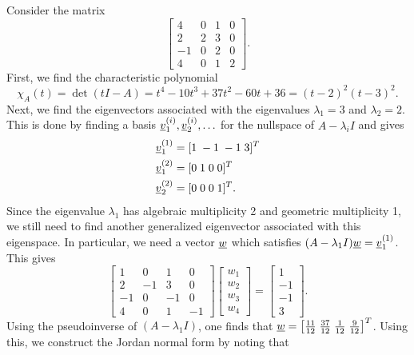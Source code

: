 \begin{example}
Consider the matrix
\begin{equation*}
\begin{bmatrix} 4 & 0 & 1 & 0 \\ 2 & 2 & 3 & 0 \\ -1 & 0 & 2 & 0 \\ 4 & 0 & 1 & 2 \end{bmatrix} .
\end{equation*}
First, we find the characteristic polynomial
\[ \chi_A (t) = \det (t I - A) = t^4 - 10 t^3 + 37 t^2 -60 t + 36 = (t-2)^2 (t-3)^2. \]
Next, we find the eigenvectors associated with the eigenvalues $\lambda_1 = 3$ and $\lambda_2 = 2$.
This is done by finding a basis $\underline{v}^{(i)}_1, \underline{v}^{(i)}_2, \ldots$ for the nullspace of $A - \lambda_i I$ and gives
\begin{align*}
\underline{v}_1^{(1)} & = [ 1 \; -1 \; -1 \; 3 ]^T \\
\underline{v}_1^{(2)} & = [ 0 \; 1 \; 0 \; 0 ]^T \\
\underline{v}_2^{(2)} & = [ 0 \; 0 \; 0 \; 1 ]^T.
\end{align*}
Since the eigenvalue $\lambda_1$ has algebraic multiplicity 2 and geometric multiplicity 1, we still need to find another generalized eigenvector associated with this eigenspace.
In particular, we need a vector $\underline{w}$ which satisfies $(A - \lambda_1 I) \underline{w} = \underline{v}^{(1)}_1$.
This gives
\begin{equation*}
\begin{bmatrix} 1 & 0 & 1 & 0 \\ 2 & -1 & 3 & 0 \\ -1 & 0 & -1 & 0 \\ 4 & 0 & 1 & -1 \end{bmatrix}
\begin{bmatrix} w_1 \\ w_2 \\ w_3 \\ w_4 \end{bmatrix}
= \begin{bmatrix} 1 \\ -1 \\ -1 \\ 3 \end{bmatrix} .
\end{equation*}
Using the pseudoinverse of $(A-\lambda_1 I)$, one finds that $\underline{w} = \left[ \frac{11}{12} \; \frac{37}{12} \; \frac{1}{12} \; \frac{9}{12} \right]^T$.
Using this, we construct the Jordan normal form by noting that

\end{example}
